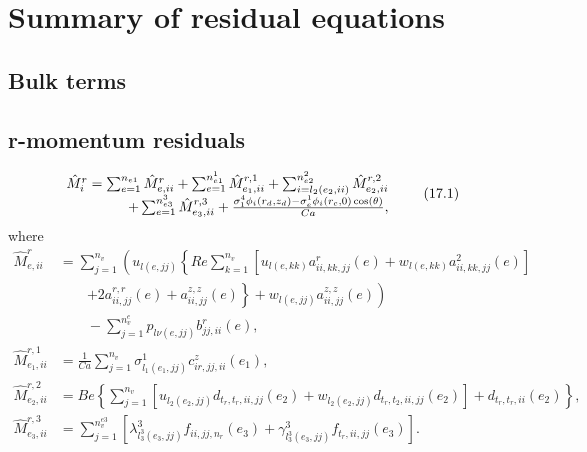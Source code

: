 \documentclass{article}
\begin{document}
\section{Summary of residual equations}
\subsection{Bulk terms}
\subsection{r-momentum residuals}

\begin{equation}
\begin{array}{r l}
\hat{M}_{i}^{r} = \sum_{e = 1}^{n_{e1}}\hat{M}_{e,ii}^{r} + \sum_{e = 1}^{n_{e1}^{1}}\hat{M}_{e_{1},ii}^{r,1} + \sum_{i = l_{2}(e_{2},ii)}^{n_{e2}^{2}}\hat{M}_{e_{2},ii}^{r,2} \\
\qquad +\sum_{e = 1}^{n_{e3}^{3}}\hat{M}_{e_{3},ii}^{r,3} + \frac{\sigma_{1}^{4}\phi_{i}(r_{d},z_{d}) - \sigma_{e}^{1}\phi_{i}(r_{c},0)\cos(\theta)}{C a},
\end{array} \tag{17.1}
\end{equation}
where
\begin{align}
\hat{M}_{e,ii}^{r} &= \sum_{j = 1}^{n_{v}}\left(u_{l(e,jj)}\left\{Re\sum_{k = 1}^{n_{v}}\left[u_{l(e,kk)}a_{ii,kk,jj}^{r}(e) + w_{l(e,kk)}a_{ii,kk,jj}^{2}(e)\right]\right.\right. \nonumber\\
&\qquad \left.\left. + 2a_{ii,jj}^{r,r}(e) + a_{ii,jj}^{z,z}(e)\right\} +w_{l(e,jj)}a_{ii,jj}^{z,z}(e)\right) \nonumber\\
&\qquad -\sum_{j = 1}^{n_{v}^{e}}p_{l\nu (e,jj)}b_{jj,ii}^{r}(e), \tag{17.2}\\
\hat{M}_{e_{1},ii}^{r,1} &= \frac{1}{C a}\sum_{j = 1}^{n_{v}}\sigma_{l_{1}(e_{1},jj)}^{1}c_{ir,jj,ii}^{z}(e_{1}), \tag{17.3}\\
\hat{M}_{e_{2},ii}^{r,2} &= Be\left\{\sum_{j = 1}^{n_{v}}\left[u_{l_{2}(e_{2},jj)}d_{t_{r},t_{r},ii,jj}(e_{2}) + w_{l_{2}(e_{2},jj)}d_{t_{r},t_{2},ii,jj}(e_{2})\right] + d_{t_{r},t_{r},ii}(e_{2})\right\}, \tag{17.4}\\
\hat{M}_{e_{3},ii}^{r,3} &= \sum_{j = 1}^{n_{v}^{e3}}\left[\lambda_{l_{3}^{3}(e_{3},jj)}^{3}f_{ii,jj,n_{r}}(e_{3}) + \gamma_{l_{3}^{3}(e_{3},jj)}^{3}f_{t_{r},ii,jj}(e_{3})\right]. \tag{17.5}
\end{align}
\end{document}
